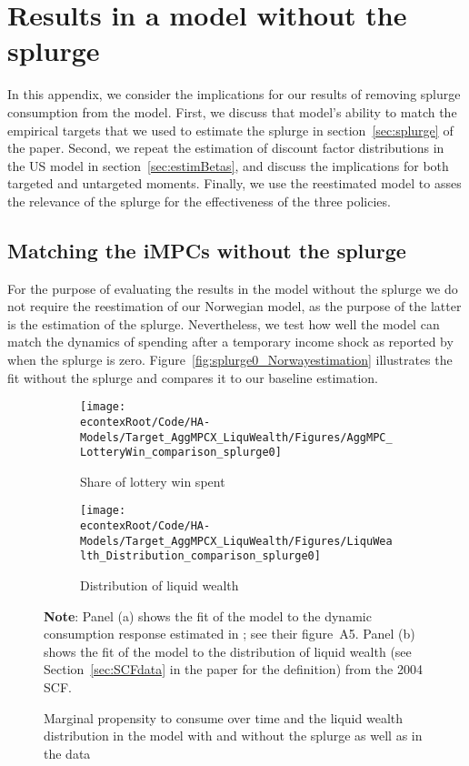 \documentclass[\econtexRoot/HAFiscal-online-appendix]{subfiles}
\begin{document}
\hypertarget{Model_without_splurge}{}\par\section{Results in a model without the splurge}
\label{app:Model_without_splurge}

In this appendix, we consider the implications for our results of removing splurge consumption from the model. First, we discuss that model's ability to match the empirical targets that we used to estimate the splurge in section~\ref{sec:splurge} of the paper. Second, we repeat the estimation of discount factor distributions in the US model in section~\ref{sec:estimBetas}, and discuss the implications for both targeted and untargeted moments. Finally, we use the reestimated model to asses the relevance of the splurge for the effectiveness of the three policies.


\subsection{Matching the iMPCs without the splurge}

For the purpose of evaluating the results in the model without the splurge we do not require the reestimation of our Norwegian model, as the purpose of the latter is the estimation of the splurge. Nevertheless, we test how well the model can match the dynamics of spending after a temporary income shock as reported by \citet{fagereng_mpc_2021} when the splurge is zero.
Figure~\ref{fig:splurge0_Norwayestimation} illustrates the fit without the splurge and compares it to our baseline estimation.


\begin{figure}[htb]
	\centering
	\begin{subfigure}[b]{.48\linewidth}
		\centering
		\texttt{[image: \\econtexRoot/Code/HA-Models/Target\_AggMPCX\_LiquWealth/Figures/AggMPC\_LotteryWin\_comparison\_splurge0]}
		\caption{Share of lottery win spent}

	\end{subfigure}
	\begin{subfigure}[b]{.48\linewidth}
		\centering
		\texttt{[image: \\econtexRoot/Code/HA-Models/Target\_AggMPCX\_LiquWealth/Figures/LiquWealth\_Distribution\_comparison\_splurge0]}
		\caption{Distribution of liquid wealth}
	\end{subfigure}%
	\caption{Marginal propensity to consume over time and the liquid wealth distribution in the model with and without the splurge as well as in the data}
	\notinsubfile{\label{fig:splurge0_Norwayestimation}}
	\parbox{16cm}{\small \vspace{.15cm} \textbf{Note}: Panel (a) shows the fit of the model to the dynamic consumption response estimated in {\citet{fagereng_mpc_2021}}; see their figure~A5.
Panel (b) shows the fit of the model to the distribution of liquid wealth (see Section~\ref{sec:SCFdata} in the paper for the definition) from the 2004 SCF.\normalsize}
\end{figure}
\end{document}
